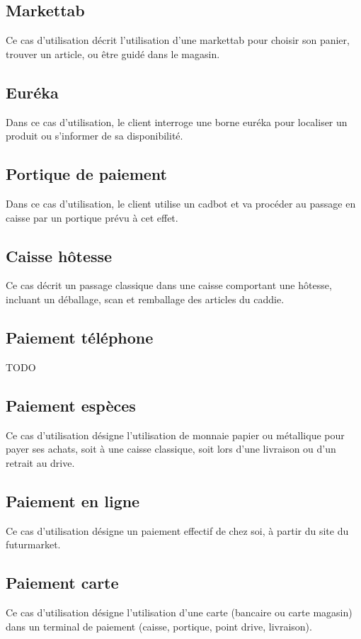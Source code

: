\subsection{Markettab}
Ce cas d'utilisation décrit l'utilisation d'une markettab pour choisir son panier, trouver un article, ou être guidé dans le magasin.

\subsection{Euréka}
Dans ce cas d'utilisation, le client interroge une borne euréka pour localiser un produit ou s'informer de sa disponibilité.

\subsection{Portique de paiement}
Dans ce cas d'utilisation, le client utilise un cadbot et va procéder au passage en caisse par un portique prévu à cet effet. 

\subsection{Caisse hôtesse}
Ce cas décrit un passage classique dans une caisse comportant une hôtesse, incluant un déballage, scan et remballage des articles du caddie.

\subsection{Paiement téléphone}
TODO

\subsection{Paiement espèces}
Ce cas d'utilisation désigne l'utilisation de monnaie papier ou métallique pour payer ses achats, soit à une caisse classique, soit lors d'une livraison ou d'un retrait au drive.

\subsection{Paiement en ligne}
Ce cas d'utilisation désigne un paiement effectif de chez soi, à partir du site du futurmarket.

\subsection{Paiement carte}
Ce cas d'utilisation désigne l'utilisation d'une carte (bancaire ou carte magasin) dans un terminal de paiement (caisse, portique, point drive, livraison).

